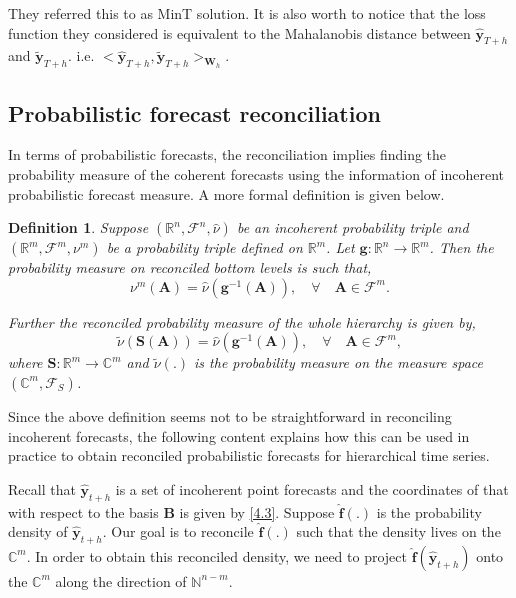 \documentclass[a4paper, 11pt]{article}
\newtheorem{definition}{Definition}[section]
\begin{document}
They referred this to as MinT solution. It is also worth to notice that the loss function they considered is equivalent to the Mahalanobis distance between $\hat{\bm{y}}_{T+h}$ and $\tilde{\bm{y}}_{T+h}$. i.e. $<\hat{\bm{y}}_{T+h}, \tilde{\bm{y}}_{T+h}>_{\bm{W}_h}$.

\subsection{Probabilistic forecast reconciliation}

In terms of probabilistic forecasts, the reconciliation implies finding the probability measure of the coherent forecasts using the information of incoherent probabilistic forecast measure. A more formal definition is given below.

\begin{definition} \label{def:reconprob}
	Suppose $(\mathbb{R}^n, \mathscr{F}^n, \hat{\nu})$ be an incoherent probability triple and $(\mathbb{R}^m, \mathscr{F}^m, \nu^m)$ be a probability triple defined on $\mathbb{R}^m$. Let $\bm{g}:\mathbb{R}^n \rightarrow \mathbb{R}^m $. Then the probability measure on reconciled bottom levels is such that,
	\begin{equation}
	\nu^m(\bm{A}) = \hat{\nu}(\bm{g}^{-1}(\bm{A})), \quad \forall \quad \bm{A} \in \mathscr{F}^m.
	\end{equation}
	
	Further the reconciled probability measure of the whole hierarchy is given by,
	\begin{equation}
	\tilde{\nu}(\bm{S}(\bm{A})) = \hat{\nu}(\bm{g}^{-1}(\bm{A})), \quad \forall \quad \bm{A} \in \mathscr{F}^m,
	\end{equation}
	where $\bm{S}:\mathbb{R}^m \rightarrow \mathbb{C}^m$ and $\tilde{\nu}(.)$ is the probability measure on the measure space $(\mathbb{C}^m, \mathscr{F}_S)$.
\end{definition}

Since the above definition seems not to be straightforward in reconciling incoherent forecasts, the following content explains how this can be used in practice to obtain reconciled probabilistic forecasts for hierarchical time series.

Recall that $\hat{\bm{y}}_{t+h}$ is a set of incoherent point forecasts and the coordinates of that with respect to the basis $\bm{B}$ is given by \eqref{4.3}. Suppose $\hat{\bm{f}}(.)$ is the probability density of $\hat{\bm{y}}_{t+h}$. Our goal is to reconcile $\hat{\bm{f}}(.)$ such that the density lives on the $\mathbb{C}^m$. In order to obtain this reconciled density, we need to project $\hat{\bm{f}}(\hat{\bm{y}}_{t+h})$ onto the $\mathbb{C}^m$ along the direction of $\mathbb{N}^{n-m}$.
\end{document}
